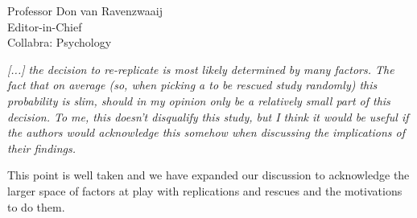 \documentclass{stanfordletter}
\newcommand{\theysaid}[1]{\begin{leftbar} \noindent 
		\textsl{ #1}\end{leftbar}}
\begin{document}
\begin{letter}{Professor Don van Ravenzwaaij \\ Editor-in-Chief \\ Collabra: Psychology }
	
	
	
	\theysaid{[...] the decision to re-replicate is most likely determined by many factors. The fact that on average (so, when picking a to be rescued study randomly) this probability is slim, should in my opinion only be a relatively small part of this decision. To me, this doesn’t disqualify this study, but I think it would be useful if the authors would acknowledge this somehow when discussing the implications of their findings.}
	
	This point is well taken and we have expanded our discussion to acknowledge the larger space of factors at play with replications and rescues and the motivations to do them. 
	

\end{letter}
\end{document}
